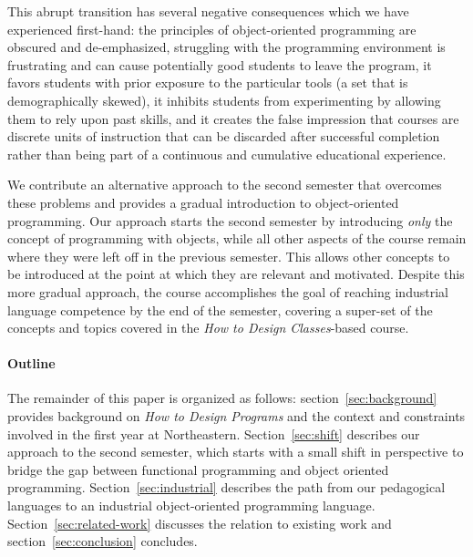 \documentclass[submission,copyright]{eptcs}
\begin{document}
This abrupt transition has several negative consequences which we have
experienced first-hand: the principles of object-oriented programming
are obscured and de-emphasized, struggling with the programming
environment is frustrating and can cause potentially good students to
leave the program, it favors students with prior exposure to the
particular tools (a set that is demographically skewed), it inhibits
students from experimenting by allowing them to rely upon past skills,
and it creates the false impression that courses are discrete units of
instruction that can be discarded after successful completion rather
than being part of a continuous and cumulative educational experience.


We contribute an alternative approach to the second semester that
overcomes these problems and provides a gradual introduction 
to object-oriented programming.  Our approach
starts the second semester by introducing \emph{only} the
concept of programming with objects, while all other aspects of the course
remain where they were left off in the previous semester.  This
 allows other concepts to be introduced at the point at
which they are relevant and motivated.  Despite this more gradual
approach, the course accomplishes the goal of reaching industrial
language competence by the end of the semester, covering a super-set
of the concepts and topics covered in the \emph{How to Design Classes}-based
course.

\paragraph{Outline} The remainder of this paper is organized as follows:
 section~\ref{sec:background} provides background on \emph{How to
  Design Programs} and the context and constraints involved in the
first year at Northeastern.  Section~\ref{sec:shift} describes our
approach to the second semester, which starts with a small shift in
perspective to bridge the gap between functional programming and
object oriented programming.  Section~\ref{sec:industrial} describes
the path from our pedagogical languages to an industrial object-oriented
programming language.  Section~\ref{sec:related-work} discusses the
relation to existing work and section~\ref{sec:conclusion} concludes.


\end{document}
